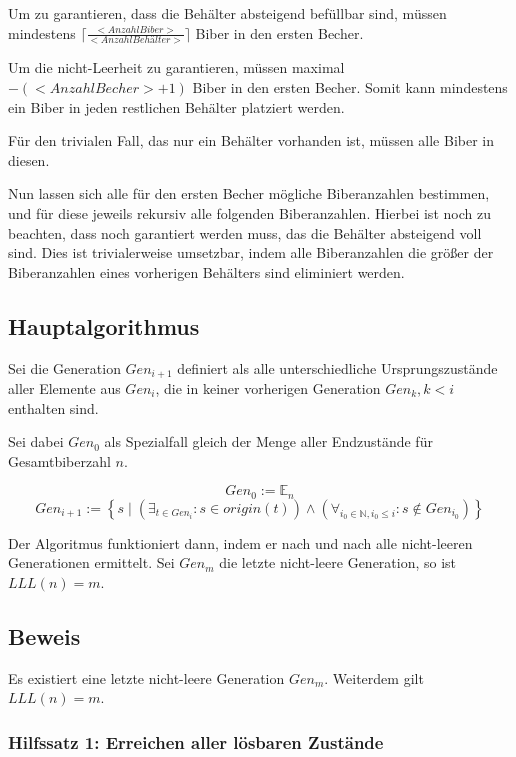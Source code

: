 \documentclass[a4paper,10pt,ngerman]{scrartcl}
\begin{document}
Um zu garantieren, dass die Behälter absteigend befüllbar sind, müssen mindestens \(\lceil\frac{<Anzahl Biber>}{<Anzahl Behälter>}\rceil\) Biber in den ersten Becher.

Um die nicht-Leerheit zu garantieren, müssen maximal \(<Anzahl Biber> - (<Anzahl Becher> + 1)\) Biber in den ersten Becher. Somit kann mindestens ein Biber in jeden restlichen Behälter platziert werden.

Für den trivialen Fall, das nur ein Behälter vorhanden ist, müssen alle Biber in diesen.

Nun lassen sich alle für den ersten Becher mögliche Biberanzahlen bestimmen, und für diese jeweils rekursiv alle folgenden Biberanzahlen. Hierbei ist noch zu beachten, dass noch garantiert werden muss, das die Behälter absteigend voll sind. Dies ist trivialerweise umsetzbar, indem alle Biberanzahlen die größer der Biberanzahlen eines vorherigen Behälters sind eliminiert werden.

\subsection{Hauptalgorithmus}

Sei die Generation \(Gen_{i+1}\) definiert als alle unterschiedliche Ursprungszustände aller Elemente aus \(Gen_i\), die in keiner vorherigen Generation \(Gen_k, k < i\) enthalten sind.

Sei dabei \(Gen_0\) als Spezialfall gleich der Menge aller Endzustände für Gesamtbiberzahl \(n\).

\[Gen_0 := \mathbb{E}_n\]
\[Gen_{i+1} := \left\{ s \mid \left(\exists_{t \in Gen_i} : s \in origin(t)\right) \land \left(\forall_{i_0\in\mathbb{N}, i_0 \leq i}: s \notin Gen_{i_0}\right) \right\}\]

Der Algoritmus funktioniert dann, indem er nach und nach alle nicht-leeren Generationen ermittelt. Sei \(Gen_m\) die letzte nicht-leere Generation, so ist \(LLL(n) = m\).

\subsection{Beweis}

Es existiert eine letzte nicht-leere Generation \(Gen_m\).
Weiterdem gilt \(LLL(n) = m\).

\subsubsection{Hilfssatz 1: Erreichen aller lösbaren Zustände} \label{proof:completeness}
\end{document}
